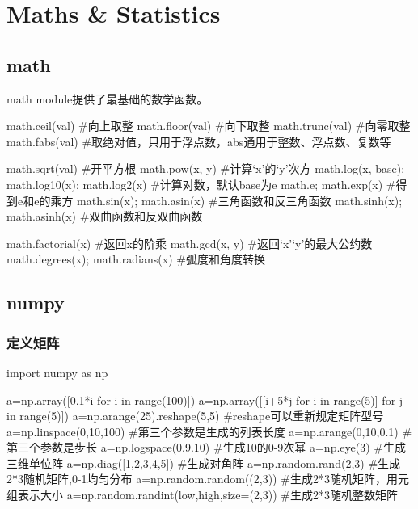 \section{Maths \& Statistics}

  \subsection{math}
    math module提供了最基础的数学函数。
    \begin{codeblock}[language=python, caption={math module}]
      math.ceil(val) #向上取整
      math.floor(val) #向下取整
      math.trunc(val) #向零取整
      math.fabs(val) #取绝对值，只用于浮点数，abs通用于整数、浮点数、复数等

      math.sqrt(val) #开平方根
      math.pow(x, y) #计算`x'的`y'次方
      math.log(x, base); math.log10(x); math.log2(x) #计算对数，默认base为e
      math.e; math.exp(x) #得到e和e的乘方
      math.sin(x); math.asin(x) #三角函数和反三角函数
      math.sinh(x); math.asinh(x) #双曲函数和反双曲函数

      math.factorial(x) #返回x的阶乘
      math.gcd(x, y) #返回`x'`y'的最大公约数
      math.degrees(x); math.radians(x) #弧度和角度转换
    \end{codeblock}

  \subsection{numpy}
    \subsubsection{定义矩阵}
      \begin{codeblock}[language=python, caption={Define matrices using numpy}]
        import numpy as np

        a=np.array([0.1*i for i in range(100)])
        a=np.array([[i+5*j for i in range(5)] for j in range(5)])
        a=np.arange(25).reshape(5,5) #reshape可以重新规定矩阵型号
        a=np.linspace(0,10,100) #第三个参数是生成的列表长度
        a=np.arange(0,10,0.1) #第三个参数是步长
        a=np.logspace(0.9.10) #生成10的0-9次幂
        a=np.eye(3) #生成三维单位阵
        a=np.diag([1,2,3,4,5]) #生成对角阵
        a=np.random.rand(2,3) #生成2*3随机矩阵,0-1均匀分布
        a=np.random.random((2,3)) #生成2*3随机矩阵，用元组表示大小
        a=np.random.randint(low,high,size=(2,3)) #生成2*3随机整数矩阵
      \end{codeblock}

